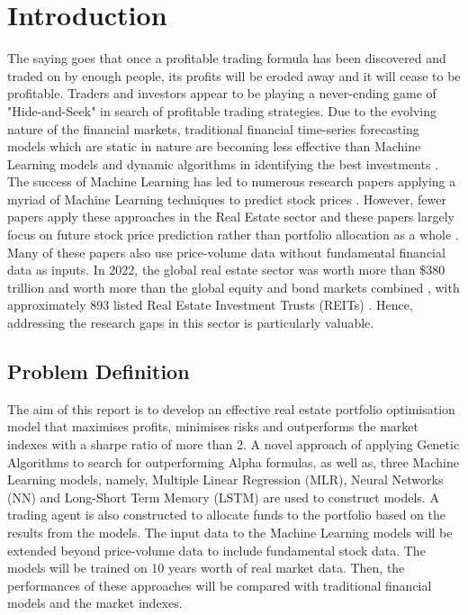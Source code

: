 \documentclass[a4paper,12pt]{report}
\renewcommand\thechapter{\Roman{chapter}}
\numberwithin{equation}{section}
\theoremstyle{definition}
\begin{document}
\tableofcontents

\setcounter{chapter}{1}
\renewcommand{\thechapter}{\arabic{chapter}}
\setcounter{chapter}{0}
\chapter{Introduction}
The saying goes that once a profitable trading formula has been discovered and traded on by enough people, its profits will be eroded away and it will cease to be profitable. Traders and investors appear to be playing a never-ending game of "Hide-and-Seek" in search of profitable trading strategies. Due to the evolving nature of the financial markets, traditional financial time-series forecasting models which are static in nature are becoming less effective than Machine Learning models and dynamic algorithms in identifying the best investments \cite{sheth_predicting_2023}. The success of Machine Learning has led to numerous research papers applying a myriad of Machine Learning techniques to predict stock prices \cite{obthong_survey_2020}. However, fewer papers apply these approaches in the Real Estate sector and these papers largely focus on future stock price prediction rather than portfolio allocation as a whole \cite{habbab_-depth_2024}. Many of these papers also use price-volume data without fundamental financial data as inputs. In 2022, the global real estate sector was worth more than \$380 trillion and worth more than the global equity and bond markets combined \cite{tostevin_total_2023}, with approximately 893 listed Real Estate Investment Trusts (REITs) \cite{nareit_global_2024}. Hence, addressing the research gaps in this sector is particularly valuable.


\section{Problem Definition}
The aim of this report is to develop an effective real estate portfolio optimisation model that maximises profits, minimises risks and outperforms the market indexes with a sharpe ratio of more than 2. A novel approach of applying Genetic Algorithms to search for outperforming Alpha formulas, as well as, three Machine Learning models, namely, Multiple Linear Regression (MLR), Neural Networks (NN) and Long-Short Term Memory (LSTM) are used to construct models. A trading agent is also constructed to allocate funds to the portfolio based on the results from the models. The input data to the Machine Learning models will be extended beyond price-volume data to include fundamental stock data. The models will be trained on 10 years worth of real market data. Then, the performances of these approaches will be compared with traditional financial models and the market indexes.
\end{document}
